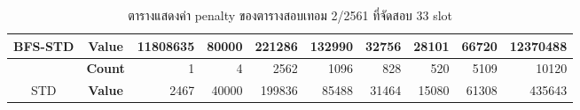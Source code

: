 \begin{table}[]
{\begin{tabular}{@{}ccrrrrrrrr@{}}
    \multirow{-2}{*}{BFS-STD}                    & \textbf{Value}                        & 11808635                       & 80000                          & 221286                         & 132990                         & 32756                          & 28101                          & 66720                          & 12370488                         \\ \midrule
                                                  & {\textbf{Count}} & {1}       & {4}       & {2562}    & {1096}    & {828}     & {520}     & {5109}    & {10120}     \\ \cmidrule(l){2-10} 
    \multirow{-2}{*}{STD} & {\textbf{Value}} & {2467}    & {40000}   & {199836}  & {85488}   & {31464}   & {15080}   & {61308}   & {435643}    \\ \bottomrule
    \end{tabular}%
    }
    \caption{ตารางแสดงค่า penalty ของตารางสอบเทอม 2/2561 ที่จัดสอบ 33 slot}
    \label{tab:result_table_261_33}
\end{table}
